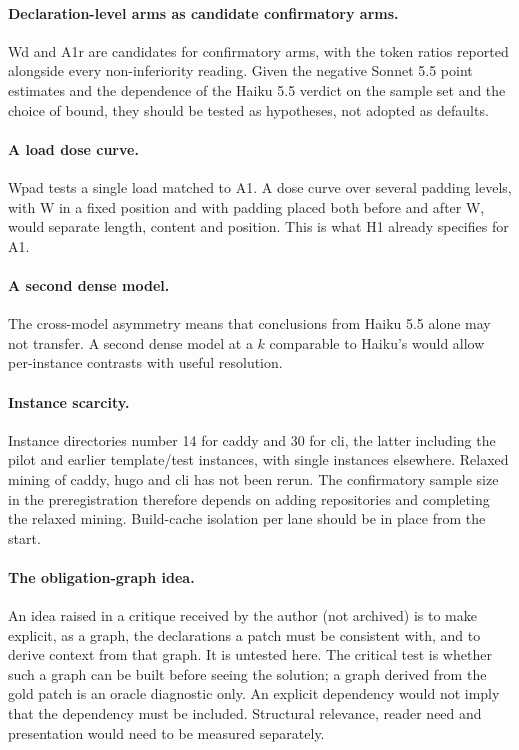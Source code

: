 \documentclass[10pt]{article}
\begin{document}
\paragraph{Declaration-level arms as candidate confirmatory arms.} Wd and A1r are candidates for confirmatory arms, with the token ratios reported alongside every non-inferiority reading. Given the negative Sonnet 5.5 point estimates and the dependence of the Haiku 5.5 verdict on the sample set and the choice of bound, they should be tested as hypotheses, not adopted as defaults.

\paragraph{A load dose curve.} Wpad tests a single load matched to A1. A dose curve over several padding levels, with W in a fixed position and with padding placed both before and after W, would separate length, content and position. This is what H1 already specifies for A1.

\paragraph{A second dense model.} The cross-model asymmetry means that conclusions from Haiku 5.5 alone may not transfer. A second dense model at a $k$ comparable to Haiku's would allow per-instance contrasts with useful resolution.

\paragraph{Instance scarcity.} Instance directories number 14 for caddy and 30 for cli, the latter including the pilot and earlier template/test instances, with single instances elsewhere. Relaxed mining of caddy, hugo and cli has not been rerun. The confirmatory sample size in the preregistration therefore depends on adding repositories and completing the relaxed mining. Build-cache isolation per lane should be in place from the start.

\paragraph{The obligation-graph idea.} An idea raised in a critique received by the author (not archived) is to make explicit, as a graph, the declarations a patch must be consistent with, and to derive context from that graph. It is untested here. The critical test is whether such a graph can be built before seeing the solution; a graph derived from the gold patch is an oracle diagnostic only. An explicit dependency would not imply that the dependency must be included. Structural relevance, reader need and presentation would need to be measured separately.
\end{document}
